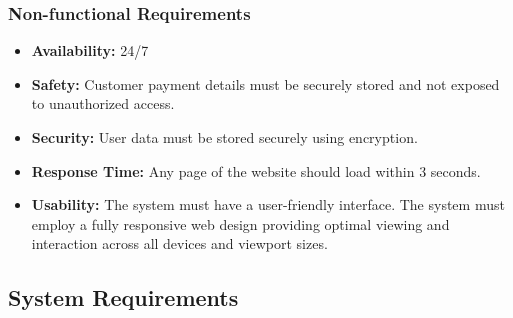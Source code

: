 \documentclass[twoside,a4paper,journal]{IEEEtran}
\begin{document}
\subsubsection{Non-functional Requirements}
\begin{itemize}
  \item \textbf{Availability:} 24/7
  \item \textbf{Safety:} Customer payment details must be
    securely stored and not exposed to unauthorized access.
  \item \textbf{Security:} User data must be stored
    securely using encryption.
  \item \textbf{Response Time:} Any page of the website
    should load within 3 seconds.
  \item \textbf{Usability:} The system must have a user-friendly interface.
    The system must employ a fully responsive web design
    providing optimal viewing and interaction across all devices and viewport
    sizes.
\end{itemize}
\subsection{System Requirements}
\end{document}
